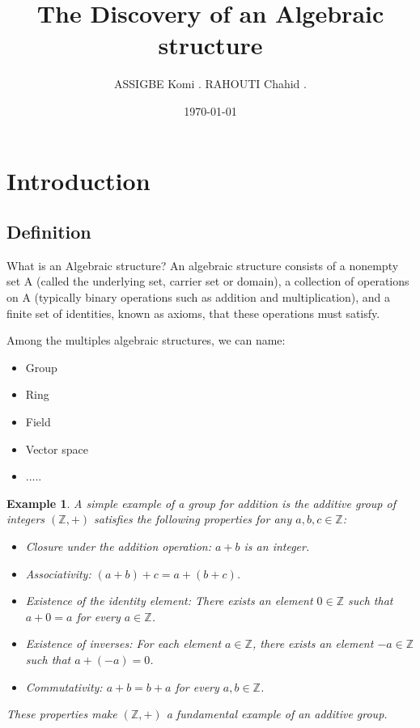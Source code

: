 \documentclass{article}
\title{The Discovery of an  Algebraic structure}
\author{ASSIGBE Komi . RAHOUTI Chahid .}
\date{\today}
\newtheorem{Example}{Example}
\begin{document}
\maketitle

\section{Introduction}
\subsection{Definition}
\begin{frame}
    What is an Algebraic structure? An algebraic structure consists of a nonempty set A (called the underlying set, carrier set or domain), a collection of operations on A (typically binary operations such as addition and multiplication), and a finite set of identities, known as axioms, that these operations must satisfy.

    Among the multiples algebraic structures, we can name:
    \begin{itemize}
        \item Group
        \item Ring
        \item Field
        \item Vector space
        \item .....
    \end{itemize}
\end{frame}
\begin{Example}
    A simple example of a group for 
    addition is the additive group 
    of integers $ (\mathbb{Z}, +) $ 
    satisfies the following properties 
    for any $ a, b, c \in \mathbb{Z} $:
    \begin{itemize}
        \item Closure under the addition operation: $ a + b $ is an integer.
        \item Associativity: $ (a + b) + c = a + (b + c) $.
        \item Existence of the identity element: There exists an element $ 0 \in \mathbb{Z} $ such that $ a + 0 = a $ for every $ a \in \mathbb{Z} $.
        \item Existence of inverses: For each element $ a \in \mathbb{Z} $, there exists an element $ -a \in \mathbb{Z} $ such that $ a + (-a) = 0 $.
        \item Commutativity: $ a + b = b + a $ for every $ a, b \in \mathbb{Z} $.
    \end{itemize}
These properties make $ (\mathbb{Z}, +) $ a fundamental example of an additive group.
    
\end{Example}   
\end{document}
